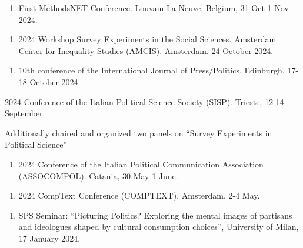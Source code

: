 \documentclass[10pt,]{article}
\providecommand{\tightlist}{%
  \setlength{\itemsep}{0pt}\setlength{\parskip}{0pt}}
\renewenvironment{itemize}{
  \begin{list}{}{
    \setlength{\leftmargin}{1.5em}
  }
}{
  \end{list}
}
\begin{document}
\begin{enumerate}
\def\labelenumi{\arabic{enumi}.}
\setcounter{enumi}{9}
\tightlist
\item
  First MethodsNET Conference. Louvain-La-Neuve, Belgium, 31 Oct-1 Nov
  2024.
\end{enumerate}

\begin{enumerate}
\def\labelenumi{\arabic{enumi}.}
\setcounter{enumi}{8}
\tightlist
\item
  2024 Workshop Survey Experiments in the Social Sciences. Amsterdam
  Center for Inequality Studies (AMCIS). Amsterdam. 24 October 2024.
\end{enumerate}

\begin{enumerate}
\def\labelenumi{\arabic{enumi}.}
\setcounter{enumi}{7}
\tightlist
\item
  10th conference of the International Journal of Press/Politics.
  Edinburgh, 17-18 October 2024.
\end{enumerate}

\begin{enumerate}
\def\labelenumi{\arabic{enumi}.}
\setcounter{enumi}{6}
\tightlist
\item
  2024 Conference of the Italian Political Science Society (SISP).
  Trieste, 12-14 September.

  \begin{itemize}
  \tightlist
  \item
    Additionally chaired and organized two panels on ``Survey
    Experiments in Political Science''
  \end{itemize}
\end{enumerate}

\begin{enumerate}
\def\labelenumi{\arabic{enumi}.}
\setcounter{enumi}{5}
\tightlist
\item
  2024 Conference of the Italian Political Communication Association
  (ASSOCOMPOL). Catania, 30 May-1 June.
\end{enumerate}

\begin{enumerate}
\def\labelenumi{\arabic{enumi}.}
\setcounter{enumi}{4}
\tightlist
\item
  2024 CompText Conference (COMPTEXT), Amsterdam, 2-4 May.
\end{enumerate}

\begin{enumerate}
\def\labelenumi{\arabic{enumi}.}
\setcounter{enumi}{3}
\tightlist
\item
  SPS Seminar: ``Picturing Politics? Exploring the mental images of
  partisans and ideologues shaped by cultural consumption choices'',
  University of Milan, 17 January 2024.
\end{enumerate}
\end{document}
